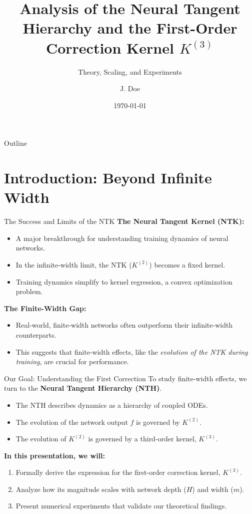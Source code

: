 \documentclass{beamer}
\title{Analysis of the Neural Tangent Hierarchy and the First-Order Correction Kernel $K^{(3)}$}
\subtitle{Theory, Scaling, and Experiments}
\author{J. Doe}
\institute{Institute for Advanced Study}
\date{\today}
\begin{document}
\begin{frame}
\titlepage
\end{frame}

\begin{frame}{Outline}
\tableofcontents
\end{frame}

\section{Introduction: Beyond Infinite Width}

\begin{frame}{The Success and Limits of the NTK}
\textbf{The Neural Tangent Kernel (NTK):}
\begin{itemize}
    \item A major breakthrough for understanding training dynamics of neural networks.
    \item In the infinite-width limit, the NTK ($K^{(2)}$) becomes a fixed kernel.
    \item Training dynamics simplify to kernel regression, a convex optimization problem.
\end{itemize}
\vspace{1cm}
\textbf{The Finite-Width Gap:}
\begin{itemize}
    \item Real-world, finite-width networks often outperform their infinite-width counterparts.
    \item This suggests that finite-width effects, like the \textit{evolution of the NTK during training}, are crucial for performance.
\end{itemize}
\end{frame}

\begin{frame}{Our Goal: Understanding the First Correction}
To study finite-width effects, we turn to the \textbf{Neural Tangent Hierarchy (NTH)}.
\begin{itemize}
    \item The NTH describes dynamics as a hierarchy of coupled ODEs.
    \item The evolution of the network output $f$ is governed by $K^{(2)}$.
    \item The evolution of $K^{(2)}$ is governed by a third-order kernel, $K^{(3)}$.
\end{itemize}
\vspace{1cm}
\textbf{In this presentation, we will:}
\begin{enumerate}
    \item Formally derive the expression for the first-order correction kernel, $K^{(3)}$.
    \item Analyze how its magnitude scales with network depth ($H$) and width ($m$).
    \item Present numerical experiments that validate our theoretical findings.
\end{enumerate}
\end{frame}
\end{document}
